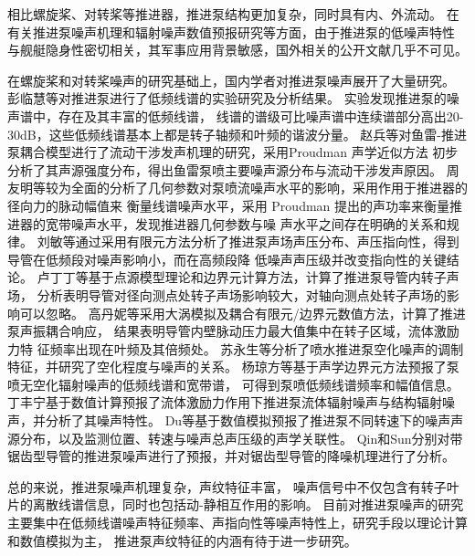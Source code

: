 相比螺旋桨、对转桨等推进器，推进泵结构更加复杂，同时具有内、外流动。
在有关推进泵噪声机理和辐射噪声数值预报研究等方面，由于推进泵的低噪声特性
与舰艇隐身性密切相关，其军事应用背景敏感，国外相关的公开文献几乎不可见。

在螺旋桨和对转桨噪声的研究基础上，国内学者对推进泵噪声展开了大量研究。
彭临慧等\cite{__1998彭临慧}对推进泵进行了低频线谱的实验研究及分析结果。
实验发现推进泵的噪声谱中，存在及其丰富的低频线谱，
线谱的谱级可比噪声谱中连续谱部分高出20-30dB，这些低频线谱基本上都是转子轴频和叶频的谐波分量。
赵兵等\cite{__2009赵兵}对鱼雷-推进泵耦合模型进行了流动干涉发声机理的研究，采用Proudman 声学近似方法
初步分析了其声源强度分布，得出鱼雷泵喷主要噪声源分布与流动干涉发声原因。
周友明等\cite{__2011周友明}较为全面的分析了几何参数对泵喷流噪声水平的影响，采用作用于推进器的径向力的脉动幅值来
衡量线谱噪声水平，采用 Proudman 提出的声功率来衡量推进器的宽带噪声水平，发现推进器几何参数与噪
声水平之间存在明确的关系和规律。
刘敏等\cite{__2011刘敏}通过采用有限元方法分析了推进泵声场声压分布、声压指向性，得到导管在低频段对噪声影响小，而在高频段降
低噪声声压级并改变指向性的关键结论。
卢丁丁等\cite{__2016卢丁丁}基于点源模型理论和边界元计算方法，计算了推进泵导管内转子声场，
分析表明导管对径向测点处转子声场影响较大，对轴向测点处转子声场的影响可以忽略。
高丹妮等\cite{__2018高丹妮}采用大涡模拟及耦合有限元/边界元数值方法，计算了推进泵声振耦合响应，
结果表明导管内壁脉动压力最大值集中在转子区域，流体激励力特
征频率出现在叶频及其倍频处。
苏永生等\cite{__2013苏永生}分析了喷水推进泵空化噪声的调制特征，并研究了空化程度与噪声的关系。
杨琼方等\cite{__2016杨琼方}基于声学边界元方法预报了泵喷无空化辐射噪声的低频线谱和宽带谱，
可得到泵喷低频线谱频率和幅值信息。
丁丰宁\cite{__2019于丰宁}基于数值计算预报了流体激励力作用下推进泵流体辐射噪声与结构辐射噪声，并分析了其噪声特性。
Du等\cite{duNumericalAnalysisFlow2019a}基于数值模拟预报了推进泵不同转速下的噪声声源分布，以及监测位置、转速与噪声总声压级的声学关联性。
Qin\cite{qinUnderwaterRadiatedNoise2019a}和Sun\cite{sunNumericalInvestigationNoise2019}分别对带锯齿型导管的推进泵噪声进行了预报，并对锯齿型导管的降噪机理进行了分析。

总的来说，推进泵噪声机理复杂，声纹特征丰富，
噪声信号中不仅包含有转子叶片的离散线谱信息，同时也包括动-静相互作用的影响。
目前对推进泵噪声的研究主要集中在低频线谱噪声特征频率、声指向性等噪声特性上，研究手段以理论计算和数值模拟为主，
推进泵声纹特征的内涵有待于进一步研究。

